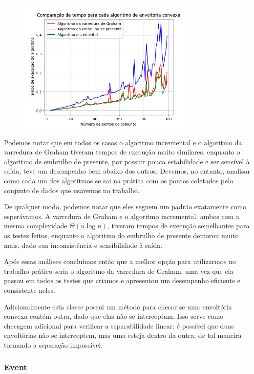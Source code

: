 \documentclass{article}
\begin{document}
\begin{figure} [H]
	\includegraphics[width=9cm]{normal.png}
	\centering
\end{figure}

Podemos notar que em todos os casos o algoritmo incremental e o algoritmo da varredura de Graham tiveram tempos de execução muito similares, enquanto o algoritmo de embrulho de presente, por possuir pouca estabilidade e ser sensível à saída, teve um desempenho bem abaixo dos outros. Devemos, no entanto, analisar como cada um dos algoritmos se sai na prática com os pontos coletados pelo conjunto de dados que usaremos no trabalho.

De qualquer modo, podemos notar que eles seguem um padrão exatamente como esperávamos. A varredura de Graham e o algoritmo incremental, ambos com a mesma complexidade \( \Theta(n \log n) \), tiveram tempos de execução semelhantes para os testes feitos, enquanto o algoritmo do embrulho de presente demorou muito mais, dado sua inconsistência e sensibilidade à saída.

Após essas análises concluímos então que a melhor opção para utilizarmos no trabalho prático seria o algoritmo da varredura de Graham, uma vez que ela passou em todos os testes que criamos e apresentou um desempenho eficiente e consistente neles.

Adicionalmente esta classe possui um método para checar se uma envoltória convexa contém outra, dado que elas não se interceptam. Isso serve como checagem adicional para verificar a separabilidade linear: é possível que duas envoltórias não se interceptem, mas uma esteja dentro da outra, de tal maneira tornando a separação impossível.

\subsubsection{Event}
\end{document}
